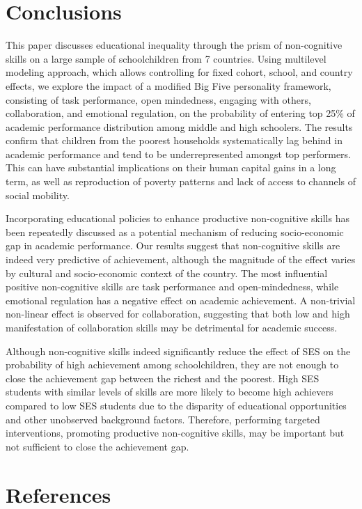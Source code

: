 \documentclass[
  12pt,
  a4paper,
]{article}
\begin{document}
\hypertarget{conclusions}{%
\section{Conclusions}\label{conclusions}}

This paper discusses educational inequality through the prism of
non-cognitive skills on a large sample of schoolchildren from 7
countries. Using multilevel modeling approach, which allows controlling
for fixed cohort, school, and country effects, we explore the impact of
a modified Big Five personality framework, consisting of task
performance, open mindedness, engaging with others, collaboration, and
emotional regulation, on the probability of entering top 25\% of
academic performance distribution among middle and high schoolers. The
results confirm that children from the poorest households systematically
lag behind in academic performance and tend to be underrepresented
amongst top performers. This can have substantial implications on their
human capital gains in a long term, as well as reproduction of poverty
patterns and lack of access to channels of social mobility.

Incorporating educational policies to enhance productive non-cognitive
skills has been repeatedly discussed as a potential mechanism of
reducing socio-economic gap in academic performance. Our results suggest
that non-cognitive skills are indeed very predictive of achievement,
although the magnitude of the effect varies by cultural and
socio-economic context of the country. The most influential positive
non-cognitive skills are task performance and open-mindedness, while
emotional regulation has a negative effect on academic achievement. A
non-trivial non-linear effect is observed for collaboration, suggesting
that both low and high manifestation of collaboration skills may be
detrimental for academic success.

Although non-cognitive skills indeed significantly reduce the effect of
SES on the probability of high achievement among schoolchildren, they
are not enough to close the achievement gap between the richest and the
poorest. High SES students with similar levels of skills are more likely
to become high achievers compared to low SES students due to the
disparity of educational opportunities and other unobserved background
factors. Therefore, performing targeted interventions, promoting
productive non-cognitive skills, may be important but not sufficient to
close the achievement gap.

\hypertarget{references}{%
\section*{References}\label{references}}
\end{document}
